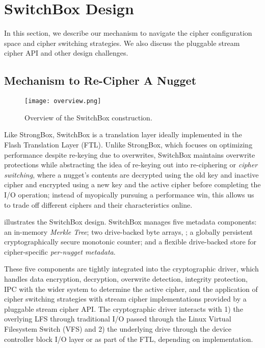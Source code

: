 \section{SwitchBox Design}\label{sec:design}


In this section, we describe our mechanism to navigate the cipher configuration
space and cipher switching strategies. We also discuss the pluggable stream
cipher API and other design challenges.

\subsection{Mechanism to Re-Cipher A Nugget}

\begin{figure}[t]
   \centering
   \texttt{[image: overview.png]}
   \caption{Overview of the SwitchBox construction.}\label{fig:overview}
\end{figure}

Like StrongBox, SwitchBox is a translation layer ideally implemented in the
Flash Translation Layer (FTL). Unlike StrongBox, which focuses on optimizing
performance despite re-keying due to overwrites, SwitchBox maintains overwrite
protections while abstracting the idea of re-keying out into re-ciphering or
\emph{cipher switching}, where a nugget's contents are decrypted using the old
key and inactive cipher and encrypted using a new key and the active cipher
before completing the I/O operation; instead of myopically pursuing a
performance win, this allows us to trade off different ciphers and their
characteristics online.

 illustrates the SwitchBox design. SwitchBox manages five
metadata components: an in-memory \emph{Merkle Tree}; two drive-backed byte
arrays, ; a
globally persistent cryptographically secure monotonic counter; and a flexible
drive-backed store for cipher-specific \emph{per-nugget metadata}.

These five components are tightly integrated into the cryptographic driver,
which handles data encryption, decryption, overwrite detection, integrity
protection, IPC with the wider system to determine the active cipher, and the
application of cipher switching strategies with stream cipher implementations
provided by a pluggable stream cipher API. The cryptographic driver interacts
with 1) the overlying LFS through traditional I/O passed through the Linux
Virtual Filesystem Switch (VFS) and 2) the underlying drive through the device
controller block I/O layer or as part of the FTL, depending on implementation.

